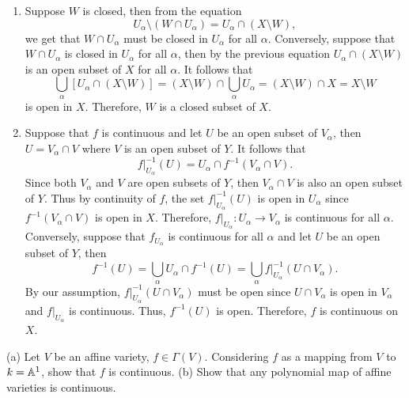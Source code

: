 \begin{solution}
    \begin{enumerate}
        \item Suppose $W$ is closed, then from the equation
        $$U_{\alpha}\setminus (W \cap U_{\alpha}) = U_{\alpha} \cap (X \setminus W),$$
        we get that $W \cap U_{\alpha}$ must be closed in $U_{\alpha}$ for all $\alpha$. Conversely, suppose that $W \cap U_{\alpha}$ is closed in $U_{\alpha}$ for all $\alpha$, then by the previous equation $U_{\alpha}\cap (X \setminus W)$ is an open subset of $X$ for all $\alpha$. It follows that
        $$\bigcup_{\alpha}\left[U_{\alpha}\cap (X \setminus W)\right] = (X \setminus W) \cap \bigcup_{\alpha}U_{\alpha} = (X \setminus W)\cap X = X \setminus W$$
        is open in $X$. Therefore, $W$ is a closed subset of $X$.
        \item Suppose that $f$ is continuous and let $U$ be an open subset of $V_{\alpha}$, then $U = V_{\alpha}\cap V$ where $V$ is an open subset of $Y$. It follows that
        $$f|_{U_{\alpha}}^{-1}(U) = U_{\alpha}\cap f^{-1}(V_{\alpha}\cap V).$$
        Since both $V_{\alpha}$ and $V$ are open subsets of $Y$, then $V_{\alpha}\cap V$ is also an open subset of $Y$. Thus by continuity of $f$, the set $f|_{U_{\alpha}}^{-1}(U)$ is open in $U_{\alpha}$ since $f^{-1}(V_{\alpha}\cap V)$ is open in $X$. Therefore, $f|_{U_{\alpha}} : U_{\alpha} \to V_{\alpha}$ is continuous for all $\alpha$. Conversely, suppose that $f_{U_{\alpha}}$ is continuous for all $\alpha$ and let $U$ be an open subset of $Y$, then
        $$f^{-1}(U) = \bigcup_{\alpha}U_{\alpha}\cap f^{-1}(U) = \bigcup_{\alpha}f|_{U_{\alpha}}^{-1}(U \cap V_{\alpha}).$$
        By our assumption, $f|_{U_{\alpha}}^{-1}(U \cap V_{\alpha})$ must be open since $U \cap V_{\alpha}$ is open in $V_{\alpha}$ and $f|_{U_{\alpha}}$ is continuous. Thus, $f^{-1}(U)$ is open. Therefore, $f$ is continuous on $X$. \\
    \end{enumerate}
\end{solution}

\begin{exercise}
    (a) Let $V$ be an affine variety, $f \in \Gamma(V)$. Considering $f$ as a mapping from $V$ to $k = \mathbb{A}^1$, show that $f$ is continuous. (b) Show that any polynomial map of affine varieties is continuous. \\
\end{exercise}


